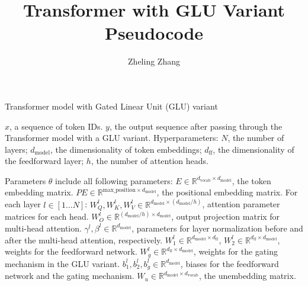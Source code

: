 \documentclass{article}
\title{Transformer with GLU Variant Pseudocode}
\author{Zheling Zhang}
\begin{document}
\maketitle

\begin{algorithm}
\caption{Transformer model with Gated Linear Unit (GLU) variant}
\begin{algorithmic}[1]

\Require $x$, a sequence of token IDs.
\Ensure $y$, the output sequence after passing through the Transformer model with a GLU variant.
\State Hyperparameters: $N$, the number of layers; $d_{\text{model}}$, the dimensionality of token embeddings; $d_{\text{ff}}$, the dimensionality of the feedforward layer; $h$, the number of attention heads.

\State Parameters $\theta$ include all following parameters:
\State \hspace{\algorithmicindent} $E \in \mathbb{R}^{d_{\text{vocab}} \times d_{\text{model}}}$, the token embedding matrix.
\State \hspace{\algorithmicindent} $PE \in \mathbb{R}^{\text{max\_position} \times d_{\text{model}}}$, the positional embedding matrix.
\State \hspace{\algorithmicindent} For each layer $l \in [1...N]$:
\State \hspace{\algorithmicindent}\hspace{\algorithmicindent} $W_Q^l, W_K^l, W_V^l \in \mathbb{R}^{d_{\text{model}} \times (d_{\text{model}}/h)}$, attention parameter matrices for each head.
\State \hspace{\algorithmicindent}\hspace{\algorithmicindent} $W_O^l \in \mathbb{R}^{(d_{\text{model}}/h) \times d_{\text{model}}}$, output projection matrix for multi-head attention.
\State \hspace{\algorithmicindent}\hspace{\algorithmicindent} $\gamma^l, \beta^l \in \mathbb{R}^{d_{\text{model}}}$, parameters for layer normalization before and after the multi-head attention, respectively.
\State \hspace{\algorithmicindent}\hspace{\algorithmicindent} $W_1^l \in \mathbb{R}^{d_{\text{model}} \times d_{\text{ff}}}$, $W_2^l \in \mathbb{R}^{d_{\text{ff}} \times d_{\text{model}}}$, weights for the feedforward network.
\State \hspace{\algorithmicindent}\hspace{\algorithmicindent} $W_g^l \in \mathbb{R}^{d_{\text{ff}} \times d_{\text{model}}}$, weights for the gating mechanism in the GLU variant.
\State \hspace{\algorithmicindent}\hspace{\algorithmicindent} $b_1^l, b_2^l, b_g^l \in \mathbb{R}^{d_{\text{model}}}$, biases for the feedforward network and the gating mechanism.
\State \hspace{\algorithmicindent} $W_u \in \mathbb{R}^{d_{\text{model}} \times d_{\text{vocab}}}$, the unembedding matrix.


\end{algorithmic}
\end{algorithm}
\end{document}
